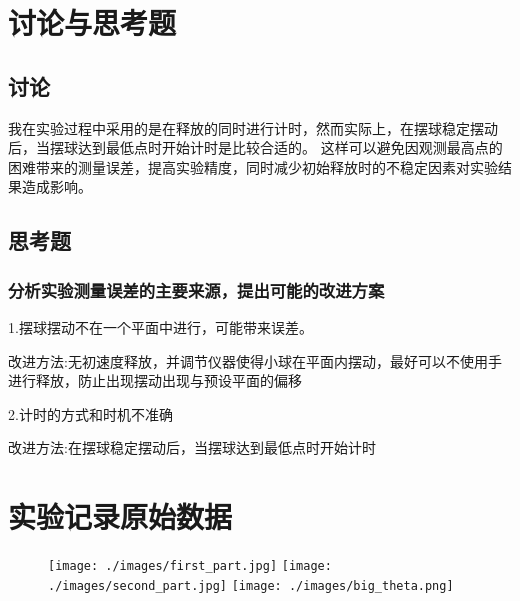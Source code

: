 \documentclass{article}
\begin{document}
\section{讨论与思考题}

    \subsection{讨论}
        我在实验过程中采用的是在释放的同时进行计时，然而实际上，在摆球稳定摆动后，当摆球达到最低点时开始计时是比较合适的。
        这样可以避免因观测最高点的困难带来的测量误差，提高实验精度，同时减少初始释放时的不稳定因素对实验结果造成影响。
    \subsection{思考题}
        
    \subsubsection{分析实验测量误差的主要来源，提出可能的改进方案}
        
        1.摆球摆动不在一个平面中进行，可能带来误差。
        
        改进方法:无初速度释放，并调节仪器使得小球在平面内摆动，最好可以不使用手进行释放，防止出现摆动出现与预设平面的偏移
        
        2.计时的方式和时机不准确

        改进方法:在摆球稳定摆动后，当摆球达到最低点时开始计时
\pagebreak
\section{实验记录原始数据}
\begin{figure}[!hbtp]
    \texttt{[image: ./images/first\_part.jpg]}
    \texttt{[image: ./images/second\_part.jpg]}
    \texttt{[image: ./images/big\_theta.png]}
\end{figure}
\end{document}
